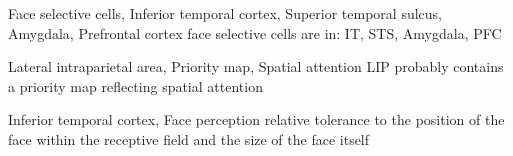 \begin{kite}{Face selective cells, Inferior temporal cortex, Superior temporal sulcus, Amygdala, Prefrontal cortex}
  face selective cells are in: IT, STS, Amygdala, PFC
\end{kite}


\begin{kite}{Lateral intraparietal area, Priority map, Spatial attention}
  LIP probably contains a priority map reflecting spatial attention
\end{kite}


\begin{kite}{Inferior temporal cortex, Face perception}
  relative tolerance to the position of the face within the receptive
  field and the size of the face itself
\end{kite}
